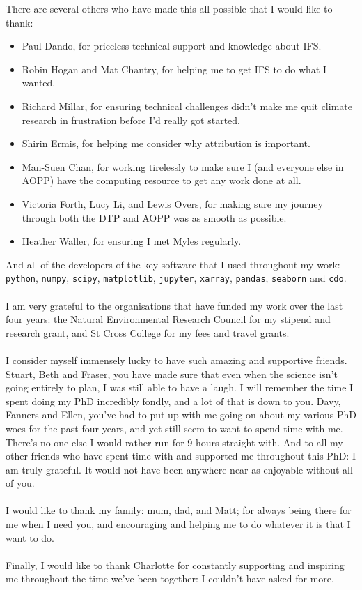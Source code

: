 There are several others who have made this all possible that I would like to thank:
\begin{itemize}[label={},leftmargin=*]
    \itemsep0em
    \item Paul Dando, for priceless technical support and knowledge about IFS.
    \item Robin Hogan and Mat Chantry, for helping me to get IFS to do what I wanted.
    \item Richard Millar, for ensuring technical challenges didn't make me quit climate research in frustration before I'd really got started.
    \item Shirin Ermis, for helping me consider why attribution is important.
    \item Man-Suen Chan, for working tirelessly to make sure I (and everyone else in AOPP) have the computing resource to get any work done at all.
    \item Victoria Forth, Lucy Li, and Lewis Overs, for making sure my journey through both the DTP and AOPP was as smooth as possible.
    \item Heather Waller, for ensuring I met Myles regularly.
\end{itemize}
And all of the developers of the key software that I used throughout my work: \texttt{python}, \texttt{numpy}, \texttt{scipy}, \texttt{matplotlib}, \texttt{jupyter}, \texttt{xarray}, \texttt{pandas}, \texttt{seaborn} and \texttt{cdo}.\\\\
I am very grateful to the organisations that have funded my work over the last four years: the Natural Environmental Research Council for my stipend and research grant, and St Cross College for my fees and travel grants.\\\\
I consider myself immensely lucky to have such amazing and supportive friends. Stuart, Beth and Fraser, you have made sure that even when the science isn't going entirely to plan, I was still able to have a laugh. I will remember the time I spent doing my PhD incredibly fondly, and a lot of that is down to you. Davy, Fanners and Ellen, you've had to put up with me going on about my various PhD woes for the past four years, and yet still seem to want to spend time with me. There's no one else I would rather run for 9 hours straight with. And to all my other friends who have spent time with and supported me throughout this PhD: I am truly grateful. It would not have been anywhere near as enjoyable without all of you.\\\\
I would like to thank my family: mum, dad, and Matt; for always being there for me when I need you, and encouraging and helping me to do whatever it is that I want to do.\\\\
Finally, I would like to thank Charlotte for constantly supporting and inspiring me throughout the time we've been together: I couldn't have asked for more.